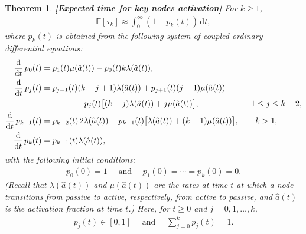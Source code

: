 \documentclass[11pt]{article}
\newtheorem{Theorem}{Theorem}[section]
\numberwithin{equation}{section}
\newcommand{\ddd}{{\rm d}}
\newcommand{\E}{\mathbb{E}}
\newcommand{\dd}{\mathrm{d}}
\begin{document}
\begin{Theorem}{\bf [Expected time for key nodes activation]}
\label{th:tauk}
For $k \geq 1$, 
\begin{align}
\label{tauk}
\E[\tau_{k}]\approx\int_{0}^{\infty}(1-p_{k}(t))\, \dd t,
\end{align}
where $p_{k}(t)$ is obtained from the following system of coupled ordinary differential equations:
\begin{equation}
\label{ODEs}
\begin{aligned}
\frac{\ddd}{\ddd t}\,p_{0}(t) &= p_{1}(t)\mu(\hat{a}(t))-p_{0}(t)k\lambda(\hat{a}(t)),\\
\frac{\ddd}{\ddd t}\,p_{j}(t) &= p_{j-1}(t)(k-j+1) \lambda(\hat{a}(t))+p_{j+1}(t) (j+1)\mu(\hat{a}(t))\\
&\qquad \qquad -p_{j}(t)\big[(k - j)\lambda(\hat{a}(t)) + j\mu(\hat{a}(t))\big],
\qquad\qquad\qquad\,\, 1\leq j\leq k-2,\\
\frac{\ddd}{\ddd t}\,p_{k-1}(t) &= p_{k-2}(t)\, 2\lambda(\hat{a}(t))-p_{k-1}(t)\big[\lambda(\hat{a}(t)) 
+ (k-1)\mu(\hat{a}(t))\big],
\qquad k>1,\\
\frac{\ddd}{\ddd t}\,p_{k}(t) &= p_{k-1}(t) \lambda(\hat{a}(t)),
\end{aligned}
\end{equation}
with the following initial conditions:
\begin{align*}
p_{0}(0)=1 \quad \text{ and } \quad p_{1}(0)=\cdots =p_{k}(0)=0.
\end{align*}
(Recall that $\lambda(\hat{a}(t))$ and $\mu(\hat{a}(t))$ are the rates at time $t$ at which a node transitions from passive to active, respectively, from active to passive, and $\hat{a}(t)$ is the activation fraction at time $t$.) Here, for $t\geq 0$ and $j=0,1,\ldots ,k$,
\begin{align*}
p_{j}(t)\in [0,1] \quad\text{ and }\quad \sum_{j=0}^{k}p_{j}(t)=1.
\end{align*}
\end{Theorem}
\end{document}
